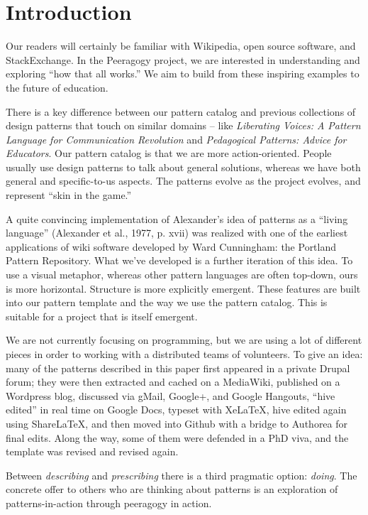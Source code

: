 \section{Introduction}

Our readers will certainly be familiar with Wikipedia, open source software, and StackExchange.  In the Peeragogy project, we are interested in understanding and exploring ``how that all works.''  We aim to build from these inspiring examples to the future of education.

There is a key difference between our pattern catalog and previous collections of design patterns that touch on similar domains -- like \emph{Liberating Voices: A Pattern Language for Communication Revolution} and \emph{Pedagogical Patterns: Advice for Educators}.  Our pattern catalog is that we are more action-oriented.  People usually use design patterns to talk about general solutions, whereas we have both general and specific-to-us aspects. The patterns evolve as the project evolves, and represent ``skin in the game.''

A quite convincing implementation of Alexander’s idea of patterns as a “living language” (Alexander et
al., 1977, p. xvii) was realized with one of the earliest applications of wiki
software developed by Ward Cunningham: the Portland Pattern Repository.
What we've developed is a further iteration of this idea. To use a visual metaphor, whereas other pattern languages are often top-down, ours is more horizontal.  Structure is more explicitly emergent.  These features are built
into our pattern template and the way we use the pattern catalog.  This is suitable for a project
that is itself emergent.

We are not currently focusing on programming, but we are using a lot of different pieces in order to working with a distributed teams of volunteers.  To give an idea: many of the patterns described in this paper first appeared in a private Drupal forum; they were then extracted and cached on a MediaWiki, published on a Wordpress blog, discussed via gMail, Google+, and Google Hangouts, ``hive edited'' in real time on Google Docs, typeset with XeLaTeX, hive edited again using ShareLaTeX, and then moved into Github with a bridge to Authorea for final edits.  Along the way, some of them were defended in a PhD viva, and the template was revised and revised again.

Between \emph{describing} and \emph{prescribing} there is a third pragmatic option: \emph{doing}.
The concrete offer to others who are thinking about patterns is an exploration of patterns-in-action
through peeragogy in action.